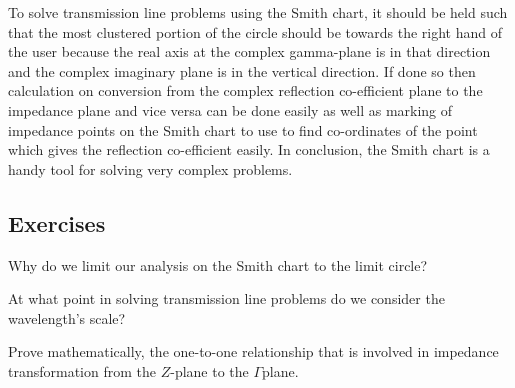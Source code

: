 To solve transmission line problems using the Smith chart, it should be held such that the most clustered portion of the circle should be towards the right hand of the user because the real axis at the complex gamma-plane is in that direction and the complex imaginary plane is in the vertical direction. If done so then calculation on conversion from the complex reflection co-efficient plane to the impedance plane and vice versa can be done easily as well as marking of impedance points on the Smith chart to use to find co-ordinates of the point which gives the reflection co-efficient easily. In conclusion, the Smith chart is a handy tool for solving very complex  problems.


\begin{mdframed}[ backgroundcolor=lightblue, linewidth=1pt, hidealllines=true]
\section*{Exercises}
\begin{ExerciseList}
\Exercise[label={ex32}]
Why do we limit our analysis on the Smith chart to the limit circle?


\Exercise[label={ex34}]
At what point in solving transmission line problems do we consider the wavelength's scale?

\Exercise[label={ex34}]
Prove mathematically, the one-to-one relationship that is involved in impedance transformation from the ${Z}$-plane to the $\Gamma$\textemdash\;plane.
\end{ExerciseList}
\end{mdframed}
